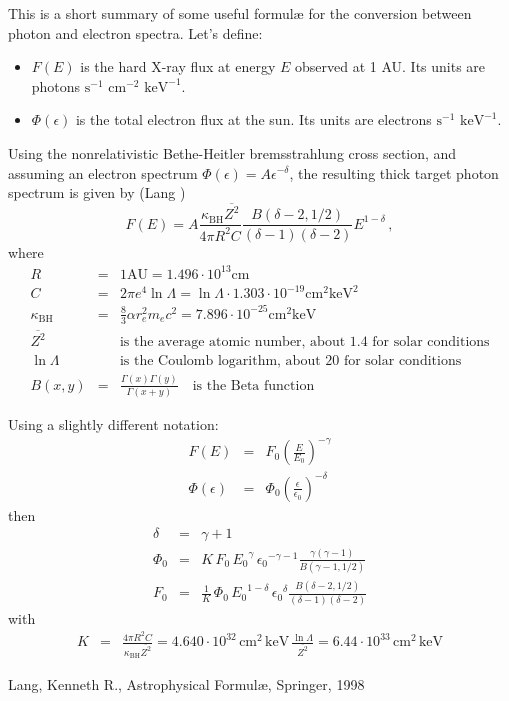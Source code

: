 \documentclass[11pt]{article}
\begin{document}
This is a short summary of some useful formul\ae\/ for the conversion
between photon and electron spectra.
Let's define:
\begin{itemize}
\item
$F(E)$ is the hard X-ray flux at energy $E$ observed at 1 AU. Its units are
photons $\mathrm{s}^{-1}$ $\mathrm{cm}^{-2}$ $\mathrm{keV}^{-1}$. 
\item
$\Phi (\epsilon)$ is the total electron flux at the sun. Its units are
electrons $\mathrm{s}^{-1}$ $\mathrm{keV}^{-1}$. 
\end{itemize}
Using the nonrelativistic Bethe-Heitler bremsstrahlung cross section, and
assuming an electron spectrum $\Phi (\epsilon)=A\epsilon^{-\delta}$, the 
resulting thick target photon spectrum is given by (Lang \cite{lang98})
\begin{equation}
F(E)=A \frac{\kappa_{\mathrm{BH}} \overline{Z^2}}{4\pi R^2 C}
\frac{B(\delta-2,1/2)}{(\delta-1)(\delta-2)} E^{1-\delta}
\, ,
\end{equation} 
where
\begin{eqnarray*}
R                    & = & \mathrm{1 AU}=1.496\cdot 10^{13} \mathrm{cm}\\
C                    & = & 2\pi e^4 \ln\Lambda = \ln\Lambda \cdot 1.303 \cdot 10^{-19} \mathrm{cm^2 keV^2} \\
\kappa_{\mathrm{BH}} & = & \frac{8}{3} \alpha r_e^2 m_e c^2 = 7.896 \cdot 10^{-25} \mathrm{cm^2 keV} \\
\overline{Z^2}       &   & \mbox{is the average atomic number, about 1.4 for solar conditions} \\
\ln\Lambda           &   & \mbox{is the Coulomb logarithm, about 20 for solar conditions} \\
B(x,y)               & = & \frac{\Gamma(x)\Gamma(y)}{\Gamma(x+y)} \quad \mbox{is the Beta function}
\end{eqnarray*} 

Using a slightly different notation:
\begin{eqnarray*}
F(E) & = & F_0 \left(\frac{E}{E_0}\right)^{-\gamma} \\
\Phi(\epsilon) & = & \Phi _0 \left(\frac{\epsilon}{\epsilon_0}\right)^{-\delta}
\end{eqnarray*}
then
\begin{eqnarray}
\delta & = & \gamma + 1\\
\Phi_0 & = & K\,{F_0}\,{E_0}^\gamma\,{\epsilon_0}^{-\gamma-1}
             \frac{\gamma(\gamma-1)}{B(\gamma-1,1/2)}\\
F_0    & = & \frac{1}{K}\,{\Phi_0}\,{E_0}^{1-\delta}\,{\epsilon_0}^{\delta}
             \frac{B(\delta-2,1/2)}{(\delta-1)(\delta-2)}
\end{eqnarray}
with 
\begin{eqnarray*}
K & = & \frac{4\pi R^2 C}{\kappa_{\mathrm{BH}}\overline{Z^2}} =
4.640 \cdot 10^{32} \,\mathrm{cm}^2\,\mathrm{keV} \,\frac{\ln\Lambda}{\overline{Z^2}}=
6.44  \cdot 10^{33} \,\mathrm{cm}^2\,\mathrm{keV}
\end{eqnarray*}


\begin{thebibliography}{}
Lang, Kenneth R., Astrophysical Formul\ae , Springer, 1998
\end{thebibliography}
\end{document}
